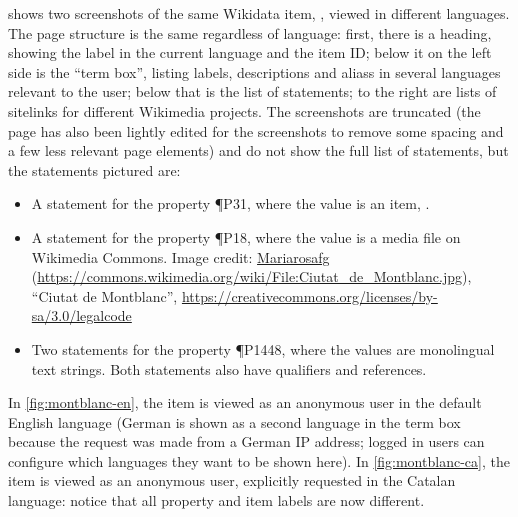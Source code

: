  shows two screenshots of the same \gls{Wikidata} \gls{item},
, viewed in different languages.
The page structure is the same regardless of language:
first, there is a heading, showing the \gls{label} in the current language and the \gls{item ID};
below it on the left side is the “term box”,
listing \glspl{label}, \glspl{description} and \glspl{alias} in several languages relevant to the user;
below that is the list of \glspl{statement};
to the right are lists of \glspl{sitelink} for different \gls{Wikimedia} projects.
The screenshots are truncated
(the page has also been lightly edited for the screenshots
to remove some spacing and a few less relevant page elements)
and do not show the full list of \glspl{statement},
but the \glspl{statement} pictured are:
\begin{itemize}
\item A \gls{statement} for the \gls{property} \P{P31},
  where the value is an \gls{item}, .
\item A \gls{statement} for the \gls{property} \P{P18},
  where the value is a media file on \gls{Wikimedia Commons}.
  Image credit:
  \href{https://commons.wikimedia.org/wiki/User:Mariarosafg}{Mariarosafg}
  (\url{https://commons.wikimedia.org/wiki/File:Ciutat_de_Montblanc.jpg}),
  “Ciutat de Montblanc”,
  \url{https://creativecommons.org/licenses/by-sa/3.0/legalcode}
\item Two \glspl{statement} for the \gls{property} \P{P1448},
  where the values are monolingual text strings.
  Both \glspl{statement} also have \glspl{qualifier} and \glspl{reference}.
\end{itemize}
In \cref{fig:montblanc-en},
the \gls{item} is viewed as an anonymous user in the default English language
(German is shown as a second language in the term box
because the request was made from a German IP address;
logged in users can configure which languages they want to be shown here).
In \cref{fig:montblanc-ca},
the \gls{item} is viewed as an anonymous user, explicitly requested in the Catalan language:
notice that all \gls{property} and \gls{item} \glspl{label} are now different.

